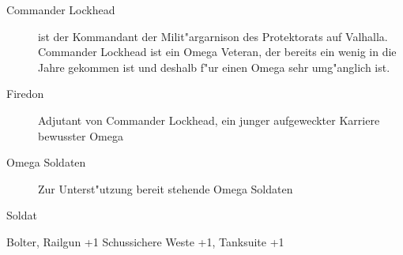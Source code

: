 
\begin{description}
    \item[Commander Lockhead] ist der Kommandant der Milit"argarnison des Protektorats auf Valhalla. Commander Lockhead ist ein 
        Omega Veteran, der bereits ein wenig in die Jahre gekommen ist und deshalb f"ur einen Omega sehr umg"anglich ist. 
    \item[Firedon] Adjutant von Commander Lockhead, ein junger aufgeweckter Karriere bewusster Omega
    \item[Omega Soldaten] Zur Unterst"utzung bereit stehende Omega Soldaten
\end{description}

\begin{nscsheet}{Soldat}
    \nscstats[ATT=3,AGG=2,CON=2]
    \nscruler
    \begin{nscinventory}
        \nscitem[Waffen] Bolter, Railgun +1
        \nscitem[R"ustung] Schussichere Weste +1, Tanksuite +1
    \end{nscinventory}
\end{nscsheet}
